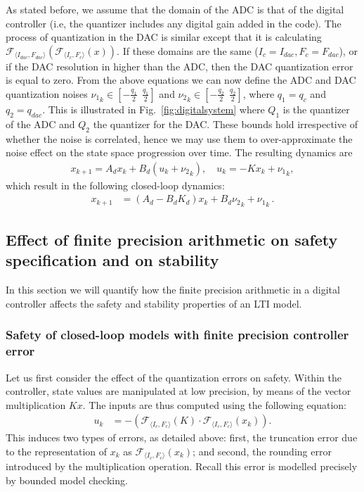 As stated before, we assume that the domain of the
ADC is that of the digital controller (i.e, the quantizer includes any
digital gain added in the code).  The process of quantization in the DAC is
similar except that it is calculating $\mathcal{F}_{\langle I_{dac},F_{dac}
\rangle} (\mathcal{F}_{\langle I_{c},F_{c} \rangle }(x)) $.  If these domains
are the same ($I_{c}=I_{dac},\allowbreak F_{c}=F_{dac}$), or if the DAC
resolution in higher than the ADC, then the DAC quantization error is equal
to zero.  From the above equations we can now define the ADC and DAC
quantization noises ${\nu_1}_k \in [-\frac{q_1}{2}\ \ \frac{q_1}{2}]$ and
${\nu_2}_k \in [-\frac{q_2}{2}\ \ \frac{q_2}{2}]$, where $q_1=q_{c}$ and 
$q_2=q_\mathit{dac}$.  This is illustrated in
Fig.~\ref{fig:digitalsystem} where $Q_1$ is the quantizer of the ADC
and $Q_2$ the quantizer for the DAC.  These bounds hold irrespective of
whether the noise is correlated, hence we may use them to over-approximate
the noise effect on the state space progression over time.  The
resulting dynamics are
%
\begin{align*}
{x}_{k+1} = {A}_d{x}_k+{B}_d({u}_k+{{\nu}_2}_k), \quad u_k = -K{x}_{k}+{{\nu}_1}_k, 
\end{align*}
%
which result in the following closed-loop dynamics:
%
\begin{align*}
{x}_{k+1} &= ({A}_d-{B}_d{K}_d) {x}_k+{B}_d{{\nu}_2}_k +{{\nu}_1}_k \,. 
\end{align*}

\fi


\subsection{Effect of finite precision arithmetic on safety specification and on stability} 

In this section we will quantify how the finite precision arithmetic in a digital controller affects the
safety and stability properties of an LTI model. 

\subsubsection{Safety of closed-loop models with finite precision controller error} 

Let us first consider the effect of the quantization errors on safety. 
Within the controller, state values are manipulated at low precision,
by means of the vector multiplication $Kx$.
The inputs are thus computed using the following equation: 
%
\begin{align*}
u_{k}&=-(\mathcal{F}_{\langle I_c,F_c \rangle}(K)\cdot\mathcal{F}_{\langle I_c,F_c \rangle}(x_{k})). 
\end{align*}
This induces two types of errors, 
as detailed above: 
first, the truncation error due to the representation of $x_k$ as $\mathcal{F}_{\langle I_c,F_c
\rangle}(x_{k})$; and second, the rounding error introduced by the multiplication operation. 
Recall this error is modelled precisely by bounded model checking.

